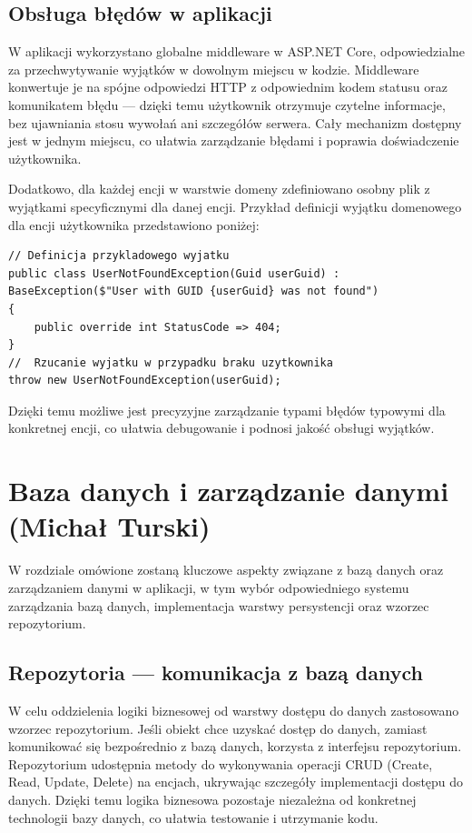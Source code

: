 \subsection{Obsługa błędów w aplikacji}
W aplikacji wykorzystano globalne middleware w ASP.NET Core, odpowiedzialne za przechwytywanie wyjątków w dowolnym miejscu w kodzie. Middleware konwertuje je na spójne odpowiedzi HTTP z odpowiednim kodem statusu oraz komunikatem błędu — dzięki temu użytkownik otrzymuje czytelne informacje, bez ujawniania stosu wywołań ani szczegółów serwera. Cały mechanizm dostępny jest w jednym miejscu, co ułatwia zarządzanie błędami i poprawia doświadczenie użytkownika.

\pagebreak

Dodatkowo, dla każdej encji w warstwie domeny zdefiniowano osobny plik z wyjątkami specyficznymi dla danej encji.
Przykład definicji wyjątku domenowego dla encji użytkownika przedstawiono poniżej:
\smallskip
\begin{lstlisting}[language={[Sharp]C}, caption={Przykład definicji wyjątku domenowego dla encji użytkownika}]
// Definicja przykladowego wyjatku 
public class UserNotFoundException(Guid userGuid) :
BaseException($"User with GUID {userGuid} was not found")
{
    public override int StatusCode => 404;
}
//  Rzucanie wyjatku w przypadku braku uzytkownika
throw new UserNotFoundException(userGuid);
\end{lstlisting}

Dzięki temu możliwe jest precyzyjne zarządzanie typami błędów typowymi dla konkretnej encji, co ułatwia debugowanie i podnosi jakość obsługi wyjątków.

\section{Baza danych i zarządzanie danymi (Michał Turski)}

W rozdziale omówione zostaną kluczowe aspekty związane z bazą danych oraz zarządzaniem danymi w aplikacji, w tym wybór odpowiedniego systemu zarządzania bazą danych, implementacja warstwy persystencji oraz wzorzec repozytorium.

\subsection{Repozytoria — komunikacja z bazą danych}

W celu oddzielenia logiki biznesowej od warstwy dostępu do danych zastosowano wzorzec repozytorium. Jeśli obiekt chce uzyskać dostęp do danych, zamiast komunikować się bezpośrednio z bazą danych, korzysta z interfejsu repozytorium. Repozytorium udostępnia metody do wykonywania operacji CRUD (Create, Read, Update, Delete) na encjach, ukrywając szczegóły implementacji dostępu do danych. Dzięki temu logika biznesowa pozostaje niezależna od konkretnej technologii bazy danych, co ułatwia testowanie i utrzymanie kodu.


